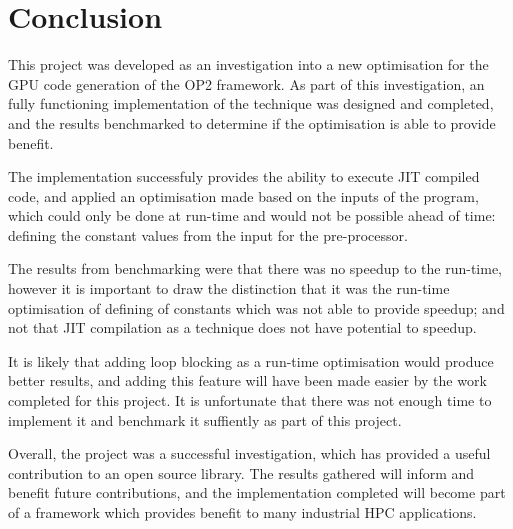 
\section{Conclusion}
\label{s:conc}

This project was developed as an investigation into a new optimisation for the GPU code generation of the OP2 framework. As part of this investigation, an fully functioning implementation of the technique was designed and completed, and the results benchmarked to determine if the optimisation is able to provide benefit.
\par
The implementation successfuly provides the ability to execute JIT compiled code, and applied an optimisation made based on the inputs of the program, which could only be done at run-time and would not be possible ahead of time: defining the constant values from the input for the pre-processor.
\par
The results from benchmarking were that there was no speedup to the run-time, however it is important to draw the distinction that it was the run-time optimisation of defining of constants which was not able to provide speedup; and not that JIT compilation as a technique does not have potential to speedup.
\par
It is likely that adding loop blocking as a run-time optimisation would produce better results, and adding this feature will have been made easier by the work completed for this project. It is unfortunate that there was not enough time to implement it and benchmark it suffiently as part of this project.\\
\par
Overall, the project was a successful investigation, which has provided a useful contribution to an open source library. The results gathered will inform and benefit future contributions, and the implementation completed will become part of a framework which provides benefit to many industrial HPC applications.
